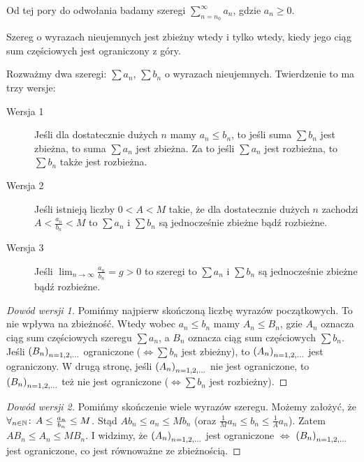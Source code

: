 \documentclass[9pt]{article}
\begin{document}
Od tej pory do odwołania badamy szeregi $\sum_{n = n_0}^{\infty} a_n$, gdzie $a_n \ge 0$.

\begin{Twi}
    Szereg o wyrazach nieujemnych jest zbieżny wtedy i tylko wtedy, kiedy jego ciąg sum częściowych
    jest ograniczony z góry.
\end{Twi}

\begin{Twi}
    Rozważmy dwa szeregi: $\sum a_n$, $\sum b_n$ o wyrazach nieujemnych. Twierdzenie to ma trzy
    wersje:
    \begin{description}
        \item[Wersja 1] Jeśli dla dostatecznie dużych $n$ mamy $a_n \le b_n$, to jeśli suma
            $\sum b_n$ jest zbieżna, to suma $\sum a_n$ jest zbieżna. Za to jeśli $\sum a_n$ jest
            rozbieżna, to $\sum b_n$ także jest rozbieżna.
        \item[Wersja 2] Jeśli istnieją liczby $0 < A < M$ takie, że dla dostatecznie dużych $n$
            zachodzi $A < \frac{a_n}{b_n} < M$ to $\sum a_n$ i $\sum b_n$ są jednocześnie zbieżne
            bądź rozbieżne.
        \item[Wersja 3] Jeśli $\lim_{n \to \infty} \frac{a_n}{b_n} = g > 0$ to szeregi to $\sum a_n$
            i $\sum b_n$ są jednocześnie zbieżne bądź rozbieżne.
    \end{description}
\end{Twi}

\begin{proof}[Dowód wersji 1]
    Pomińmy najpierw skończoną liczbę wyrazów początkowych. To nie wpływa na zbieżność. Wtedy wobec
    $a_n \le b_n$ mamy $A_n \le B_n$, gzie $A_n$ oznacza ciąg sum częściowych szeregu $\sum a_n$, a
    $B_n$ oznacza ciąg sum częściowych $\sum b_n$. Jeśli $\left(B_n\right)_{n = 1,2,...}$ ograniczone ($\iff \sum b_n$
    jest zbieżny), to $\left(A_n\right)_{n = 1,2,...}$ jest ograniczony. W drugą stronę, jeśli $\left(A_n\right)_{n = 1,2,...}$ nie jest
    ograniczone, to $\left(B_n\right)_{n = 1,2,...}$ też nie jest ograniczone ($\iff \sum b_n$ jest rozbieżny).
\end{proof}

\begin{proof}[Dowód wersji 2]
    Pomińmy skończenie wiele wyrazów szeregu. Możemy założyć, że
    $\forall_{n \in \mathbb{N}} \! : \, A \le \frac{a_n}{b_n} \le M$. Stąd $A b_n \le a_n \le M b_n$ (oraz
    $\frac{1}{M} a_n \le b_n \le \frac{1}{A}a_n$). Zatem $A B_n \le A_n \le M B_n$. I widzimy, że
    $\left(A_n\right)_{n = 1,2,...}$ jest ograniczone $\iff$ $\left(B_n\right)_{n = 1,2,...}$ jest ograniczone, co jest równoważne ze
    zbieżnością.
\end{proof}
\end{document}
